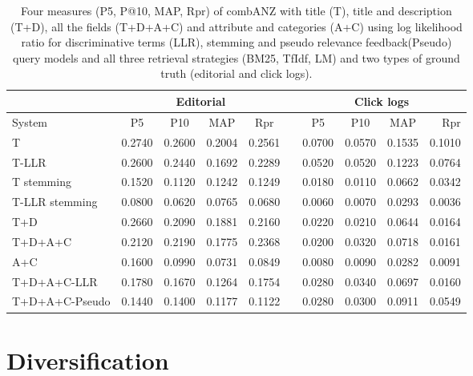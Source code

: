 \begin{table}[H]
\begin{center}
\scriptsize
\caption{
Four measures (P\@5, P@10, MAP, Rpr) of combANZ with title (T), title and description (T+D), all the fields (T+D+A+C) and attribute and categories (A+C) using log likelihood ratio for discriminative terms (LLR), stemming and pseudo relevance feedback(Pseudo) query models and all three retrieval strategies (BM25, TfIdf, LM) and two types of ground truth (editorial and click logs).}
\label{table:combANZ}

\begin{tabular}{lccccccccr}
\toprule
 & \multicolumn{4}{c}{Editorial} & & \multicolumn{4}{c}{Click logs} \\
\midrule
System & P\@5 & P\@10 & MAP & Rpr &   & P\@5 & P\@10 & MAP & Rpr \\
\midrule
T & 0.2740 & 0.2600 & 0.2004 & 0.2561 &   & 0.0700 & 0.0570 & 0.1535 & 0.1010 \\
T-LLR & 0.2600 & 0.2440 & 0.1692 & 0.2289 &   & 0.0520 & 0.0520 & 0.1223 & 0.0764 \\
T stemming & 0.1520 & 0.1120 & 0.1242 & 0.1249 &   & 0.0180 & 0.0110 & 0.0662 & 0.0342 \\
T-LLR stemming & 0.0800 & 0.0620 & 0.0765 & 0.0680 &   & 0.0060 & 0.0070 & 0.0293 & 0.0036 \\
T+D & 0.2660 & 0.2090 & 0.1881 & 0.2160 &   & 0.0220 & 0.0210 & 0.0644 & 0.0164 \\
T+D+A+C & 0.2120 & 0.2190 & 0.1775 & 0.2368 &   & 0.0200 & 0.0320 & 0.0718 & 0.0161 \\
A+C & 0.1600 & 0.0990 & 0.0731 & 0.0849 &   & 0.0080 & 0.0090 & 0.0282 & 0.0091 \\
T+D+A+C-LLR & 0.1780 & 0.1670 & 0.1264 & 0.1754 &   & 0.0280 & 0.0340 & 0.0697 & 0.0160 \\
T+D+A+C-Pseudo & 0.1440 & 0.1400 & 0.1177 & 0.1122 &   & 0.0280 & 0.0300 & 0.0911 & 0.0549 \\
	\bottomrule
\end{tabular}
\end{center}
\end{table}




\section{Diversification}

